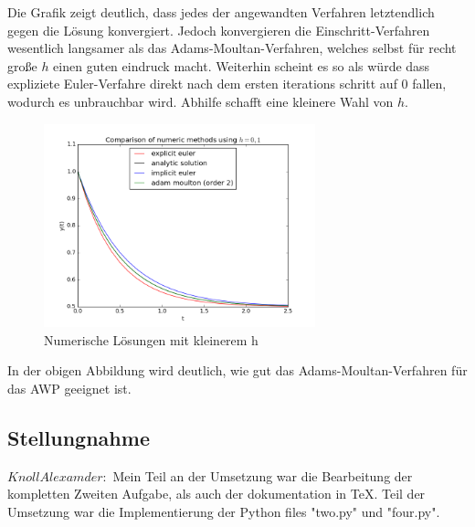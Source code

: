 \documentclass{article}
\begin{document}
				Die Grafik zeigt deutlich, dass jedes der angewandten Verfahren letztendlich gegen die Lösung konvergiert.
				Jedoch konvergieren die Einschritt-Verfahren wesentlich langsamer als das Adams-Moultan-Verfahren, welches 
				selbst für recht große $h$ einen guten eindruck macht. Weiterhin scheint es so als würde dass expliziete Euler-Verfahre direkt nach dem ersten iterations schritt auf 0 fallen, wodurch es unbrauchbar wird. Abhilfe schafft eine kleinere Wahl von $h$.
				
				\newpage
				
				\begin{figure}[htbp] 
					\centering
					\includegraphics[width=0.7\textwidth]{numeric_plots2.png}
					\caption{Numerische Lösungen mit kleinerem h}
					\label{fig:Bild3}
				\end{figure}
				
				In der obigen Abbildung wird deutlich, wie gut das Adams-Moultan-Verfahren für das AWP geeignet ist.
				
				
				
\newpage				
	\subsection{Stellungnahme}
	
		$Knoll Alexamder: $ Mein Teil an der Umsetzung war die Bearbeitung der kompletten Zweiten Aufgabe, als auch der dokumentation in TeX. Teil der Umsetzung war die Implementierung der Python files "two.py" und "four.py".		
				

\begin{thebibliography}{xxxxxxxxxxxxxxxxxxxxxxxxxxxxxxxxxxxxxx}
\end{thebibliography}
	
\end{document}
